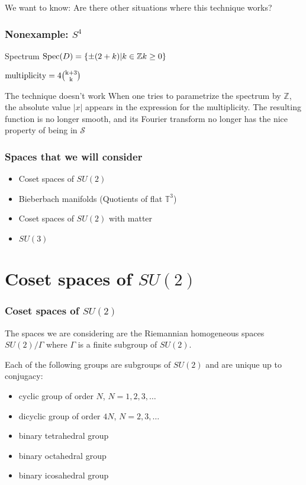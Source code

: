 \documentclass{beamer}
\def\Z{{\mathbb Z}}
\def\cS{{\mathcal S}}
\def\Spec{{\rm Spec}}
\begin{document}
\begin{frame}
	\begin{block}{}
	We want to know: Are there other situations where this technique works?
	\end{block}
\end{frame}

\begin{frame}
	\frametitle{Nonexample: $S^4$}
	\begin{block}{Spectrum}
		$\Spec(D) = \{\pm (2 + k) | k \in \Z k \geq 0 \}$

		$\rm{multiplicity} = 4 {{k+3} \choose {k}}$
	\end{block}

	\pause

	\begin{alertblock}{The technique doesn't work}
		When one tries to parametrize the spectrum by $\Z$, the absolute value $|x|$ appears in the expression for the multiplicity. The resulting function is no longer smooth, and its Fourier transform no longer has the nice property of being in $\cS$
	\end{alertblock}
\end{frame}

\begin{frame}
	\frametitle{Spaces that we will consider}
	\begin{itemize}
		\item Coset spaces of $SU(2)$
		\item Bieberbach manifolds (Quotients of flat $\mathbb{T} ^3$)
		\item Coset spaces of $SU(2)$ with matter
		\item $SU(3)$
	\end{itemize}

\end{frame}

\section{Coset spaces of $SU(2)$}

\begin{frame}
	\frametitle{Coset spaces of $SU(2)$}
	\begin{block}{}
		The spaces we are considering are the Riemannian homogeneous spaces $SU(2)/\Gamma$ where $\Gamma$ is a finite subgroup of $SU(2)$.

		Each of the following groups are subgroups of $SU(2)$ and are unique up to conjugacy:
		\begin{itemize}
			\item cyclic group of order $N$, $N = 1,2,3,\ldots$
			\item dicyclic group of order $4N$, $N = 2,3,\ldots$
			\item binary tetrahedral group
			\item binary octahedral group
			\item binary icosahedral group
		\end{itemize}
	\end{block}
\end{frame}
\end{document}
